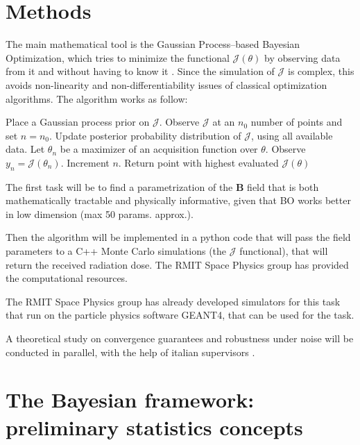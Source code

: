 \documentclass{article}
\begin{document}
	\section*{Methods}
	The main mathematical tool is the Gaussian Process–based Bayesian Optimization, which tries to minimize the functional $\mathcal{J}(\theta)$ by observing data from it and without having to know it \cite{frazier2018tutorialbayesianoptimization}. Since the simulation of $\mathcal{J}$ is complex, this avoids non-linearity and non-differentiability issues of classical optimization algorithms.
	The algorithm works as follow:
	\begin{algorithm}
		\caption{Basic BO minimization}
		\begin{algorithmic}
			\STATE Place a Gaussian process prior on $\mathcal{J}$.
			\STATE Observe $\mathcal{J}$ at an $n_0$ number of points and set $n = n_0$.
			\STATE Update posterior probability distribution of $\mathcal{J}$, using all available data.
			\STATE Let $\theta_n$ be a maximizer of an acquisition function over $\theta$.
			\STATE Observe $y_n = \mathcal{J}(\theta_n)$.
			\STATE Increment $n$.
			\ENDWHILE
			\STATE Return point with highest evaluated $\mathcal{J}(\theta)$
		\end{algorithmic}
	\end{algorithm}
	
	The first task will be to find a parametrization of the $\mathbf{B}$ field that is both mathematically tractable and physically informative, given that BO works better in low dimension (max 50 params. approx.).
	
	Then the algorithm will be implemented in a python code that will pass the field parameters to a C++ Monte Carlo simulations (the $\mathcal{J}$ functional), that will return the received radiation dose. The RMIT Space Physics group has provided the computational resources.
	
	The RMIT Space Physics group has already developed simulators for this task that run on the particle physics software GEANT4, that can be used for the task.
	
	A theoretical study on convergence guarantees and robustness under noise will be conducted in parallel, with the help of italian supervisors \cite{boconvergence2024}.
	
	\newpage
	\tableofcontents
	\newpage
	
	\section{The Bayesian framework: preliminary statistics concepts}
	
\end{document}
